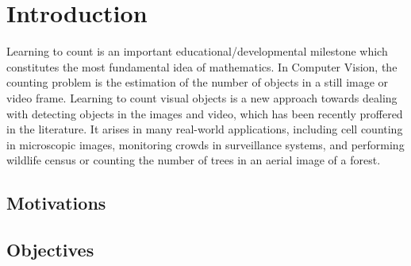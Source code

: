 \chapter{Introduction}
\label{sec:introduction}




Learning to count is an important  educational/developmental milestone  which constitutes the most fundamental idea of mathematics. In Computer Vision, the counting problem is the estimation of the number of objects in a still image or video frame. Learning to count visual objects is a new approach towards dealing with detecting objects in the images and video, which has been recently  proffered in the literature. It arises in many real-world applications, including cell counting in microscopic images, monitoring crowds in surveillance systems, and performing wildlife census or counting the number of trees in an aerial image of a forest\cite{NIPS2010_4043}. 

\section{Motivations}
\section{Objectives}
